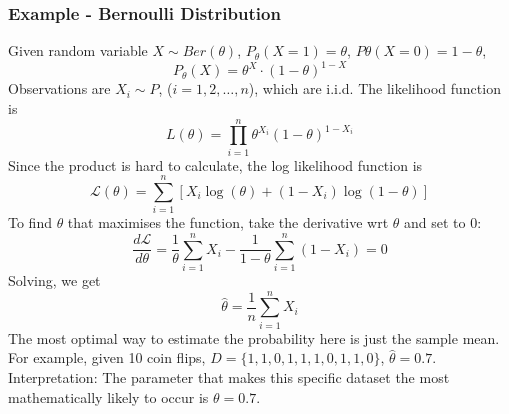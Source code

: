 \documentclass[../Probability.tex]{subfiles}
\begin{document}
\subsubsection{Example - Bernoulli Distribution}
Given random variable $X \sim Ber(\theta)$, $P_\theta(X = 1) = \theta$, $P\theta(X = 0) = 1 - \theta$,
\[P_\theta(X) = \theta^X \cdot (1 - \theta)^{1 - X}\]
Observations are $X_i \sim P$, ($i = 1, 2, \ldots, n$), which are i.i.d.
The likelihood function is
\[L(\theta) = \prod_{i=1}^{n} \theta^{X_i} (1-\theta)^{1-X_i}\]
Since the product is hard to calculate, the log likelihood function is
\[\mathcal{L}(\theta) = \sum_{i=1}^{n} \left[ X_i \log(\theta) + (1-X_i) \log(1-\theta) \right]\]
To find $\theta$ that maximises the function, take the derivative wrt $\theta$ and set to 0:
\[\frac{d\mathcal{L}}{d\theta} = \frac{1}{\theta} \sum_{i=1}^{n} X_i - \frac{1}{1-\theta} \sum_{i=1}^{n} (1-X_i) = 0\]
Solving, we get
\[\hat{\theta} = \frac{1}{n} \sum_{i=1}^{n} X_i\]
The most optimal way to estimate the probability here is just the sample mean.\newline
For example, given 10 coin flips, $D = \{1, 1, 0, 1, 1, 1, 0, 1, 1, 0\}$,
$\hat{\theta} = 0.7$.\newline
Interpretation: The parameter that makes this specific dataset the most mathematically likely to occur is $\theta = 0.7$.
\end{document}
